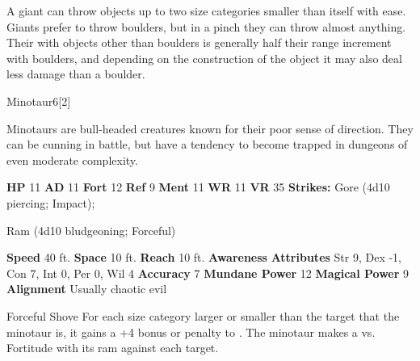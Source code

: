 {{     
        A giant can throw objects up to two size categories smaller than itself with ease.
        Giants prefer to throw boulders, but in a pinch they can throw almost anything.
        Their  with objects other than boulders is generally half their range increment with boulders, and depending on the construction of the object it may also deal less damage than a boulder.
  
  
  \begin{monsection}{Minotaur}{6}[2]
    \vspace{-1em}\vspace{-1em}
    \vspace{0em}

    
      Minotaurs are bull-headed creatures known for their poor sense of direction.
      They can be cunning in battle, but have a tendency to become trapped in dungeons of even moderate complexity.
    
    

    \begin{spellcontent}
      \begin{spelltargetinginfo}
        \pari \textbf{HP} 11 \monsep
          \textbf{AD} 11 \monsep
          \textbf{Fort} 12 \monsep
          \textbf{Ref} 9 \monsep
          \textbf{Ment} 11
        \pari \textbf{WR} 11 \monsep
        \textbf{VR} 35
        \pari \textbf{Strikes:}
            Gore  (4d10 piercing; Impact);
\par Ram  (4d10 bludgeoning; Forceful)
      \end{spelltargetinginfo}
    \end{spellcontent}
    \begin{monsterfooter}
      \pari \textbf{Speed} 40 ft. \monsep
        \textbf{Space} 10 ft. \monsep
        \textbf{Reach} 10 ft.
      \pari \textbf{Awareness} 
      \pari \textbf{Attributes}
        Str 9, Dex -1,
        Con 7, Int 0,
        Per 0, Wil 4
      \pari \textbf{Accuracy} 7 \monsep
        \textbf{Mundane Power} 12 \monsep
      \textbf{Magical Power} 9
      \pari \textbf{Alignment} Usually chaotic evil
    \end{monsterfooter}
  \end{monsection}
  \begin{freeability}{Forceful Shove}
      For each size category larger or smaller than the target that the minotaur is, it gains a +4 bonus or penalty to . The minotaur makes a 
         vs. Fortitude
        with its ram against each target.
    

\end{freeability}}}
